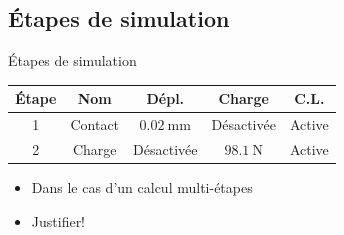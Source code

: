 \subsection{Étapes de simulation}
\label{sec:Étapes de simulation}

\begin{frame}[c]{Étapes de simulation}
    \centering
    \begin{tabular}{ccccc}
      \toprule
      Étape & Nom & Dépl. & Charge & C.L.\\
      \midrule
      1 & Contact & $0.02~\text{mm}$ & Désactivée & Active\\
      \midrule
      2 & Charge & Désactivée & $98.1~\text{N}$ & Active \\
      \bottomrule
    \end{tabular}
    \vspace{10pt}
    \begin{itemize}
        \item Dans le cas d'un calcul multi-étapes
        \item Justifier!
    \end{itemize}
\end{frame}